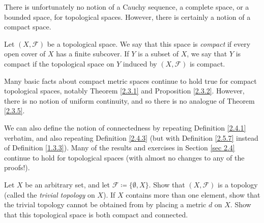 \begin{note}
    There is unfortunately no notion of a Cauchy sequence, a complete space, or a bounded space, for topological spaces.
    However, there is certainly a notion of a compact space.
\end{note}

\begin{definition}\label{2.5.9}
    Let \((X, \mathcal{F})\) be a topological space.
    We say that this space is \emph{compact} if every open cover of \(X\) has a finite subcover.
    If \(Y\) is a subset of \(X\), we say that \(Y\) is compact if the topological space on \(Y\) induced by \((X, \mathcal{F})\) is compact.
\end{definition}

\begin{note}
    Many basic facts about compact metric spaces continue to hold true for compact topological spaces, notably Theorem \ref{2.3.1} and Proposition \ref{2.3.2}.
    However, there is no notion of uniform continuity, and so there is no analogue of Theorem \ref{2.3.5}.
\end{note}

\begin{note}
    We can also define the notion of connectedness by repeating Definition \ref{2.4.1} verbatim, and also repeating Definition \ref{2.4.3} (but with Definition \ref{2.5.7} instead of Definition \ref{1.3.3}).
    Many of the results and exercises in Section \ref{sec 2.4} continue to hold for topological spaces
    (with almost no changes to any of the proofs!).
\end{note}

\exercisesection

\begin{exercise}\label{ex 2.5.1}
    Let \(X\) be an arbitrary set, and let \(\mathcal{F} \coloneqq \{\emptyset, X\}\).
    Show that \((X, \mathcal{F})\) is a topology
    (called the \emph{trivial topology} on \(X\)).
    If \(X\) contains more than one element, show that the trivial topology cannot be obtained from by placing a metric \(d\) on \(X\).
    Show that this topological space is both compact and connected.
\end{exercise}

